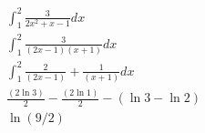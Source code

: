 \[ \begin{array} { l } \int _ { 1 } ^ { 2 } \frac { 3 } { 2 x ^ { 2 } + x - 1 } d x \\ \int _ { 1 } ^ { 2 } \frac { 3 } { ( 2 x - 1 ) ( x + 1 ) } d x \\ \int _ { 1 } ^ { 2 } \frac { 2 } { ( 2 x - 1 ) } + \frac { 1 } { ( x + 1 ) } d x \\ \frac { ( 2 \ln 3 ) } { 2 } - \frac { ( 2 \ln 1 ) } { 2 } - ( \ln 3 - \ln 2 ) \\ \ln ( 9 / 2 ) \end{array} \]